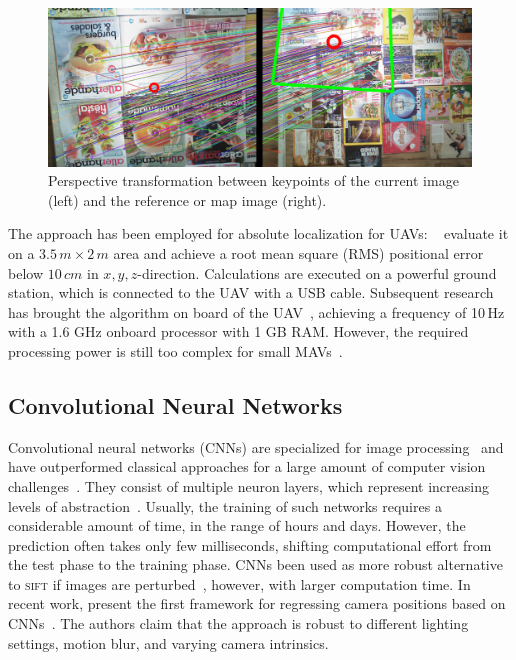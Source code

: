 \documentclass{report}
\begin{document}

\begin{figure}[h!]
\begin{center}
\includegraphics[width=0.448\columnwidth]{sift}
\caption{{Perspective transformation between keypoints of the current image (left) and the reference or map image (right).%
}}
\end{center}
\end{figure}

The approach has been employed for absolute localization for UAVs:
\citeauthor{blosch2010vision}~\cite{blosch2010vision} evaluate it on a
$3.5\,m \times 2\,m$ area and achieve a root mean square (RMS)
positional error below $10\,cm$ in $x,y,z$-direction. Calculations are
executed on a powerful ground station, which is connected to the UAV
with a USB cable. Subsequent research has brought the algorithm on
board of the UAV~\cite{achtelik2011onboard}, achieving a frequency of
10\,Hz with a 1.6 GHz onboard processor with 1 GB RAM. However, the
required processing power is still too complex for small
MAVs~\cite{de2009design}.

\subsection{Convolutional Neural Networks}

Convolutional neural networks (CNNs) are specialized for image
processing~\cite{lecun1998gradient} and have outperformed classical
approaches for a large amount of computer vision
challenges~\cite{dosovitskiy2014discriminative}. They consist of
multiple neuron layers, which represent increasing levels of
abstraction~\cite{lecun1998gradient}. Usually, the training of such
networks requires a considerable amount of time, in the range of hours
and days. However, the prediction often takes only few milliseconds,
shifting computational effort from the test phase to the training
phase. CNNs been used as more robust alternative to \textsc{sift} if
images are perturbed~\cite{dosovitskiy2014discriminative}, however,
with larger computation time. In recent work,
\citeauthor{kendall2015posenet} present the first framework for
regressing camera positions based on
CNNs~\cite{kendall2015posenet}. The authors claim that the approach is
robust to different lighting settings, motion blur, and varying camera
intrinsics.
\end{document}
